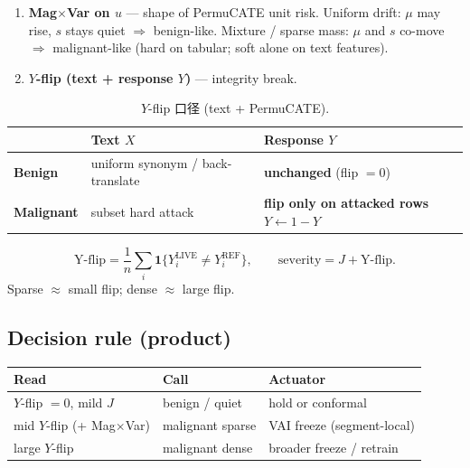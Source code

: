 \documentclass[11pt]{article}
\begin{document}
\begin{enumerate}[leftmargin=1.3em,itemsep=0.4em]
  \item \textbf{Mag$\times$Var on $u$} --- shape of PermuCATE unit risk.
    Uniform drift: $\mu$ may rise, $s$ stays quiet $\Rightarrow$ benign-like.
    Mixture / sparse mass: $\mu$ and $s$ co-move $\Rightarrow$ malignant-like
    (hard on tabular; soft alone on text features).
  \item \textbf{$Y$-flip (text + response $Y$)} --- integrity break.
\end{enumerate}

\begin{table}[h]
\centering
\caption{$Y$-flip 口径 (text + PermuCATE).}
\label{tab:yflip}
\small
\begin{tabular}{@{}lll@{}}
\toprule
 & Text $X$ & Response $Y$ \\
\midrule
\textbf{Benign} & uniform synonym / back-translate & \textbf{unchanged} (flip $=0$) \\
\textbf{Malignant} & subset hard attack & \textbf{flip only on attacked rows} $Y\leftarrow 1-Y$ \\
\bottomrule
\end{tabular}
\end{table}

\begin{equation}
  \mathrm{Y\text{-}flip}
  =\frac{1}{n}\sum_i
  \mathbf{1}\{Y_i^{\mathrm{LIVE}}\neq Y_i^{\mathrm{REF}}\},
  \qquad
  \mathrm{severity}=J+\mathrm{Y\text{-}flip}.
\end{equation}
Sparse $\approx$ small flip; dense $\approx$ large flip.

\subsection{Decision rule (product)}
\begin{center}
\small
\begin{tabular}{@{}lll@{}}
\toprule
Read & Call & Actuator \\
\midrule
$Y$-flip $=0$, mild $J$ & benign / quiet & hold or conformal \\
mid $Y$-flip (+ Mag$\times$Var) & malignant sparse & VAI freeze (segment-local) \\
large $Y$-flip & malignant dense & broader freeze / retrain \\
\bottomrule
\end{tabular}
\end{center}
\end{document}
